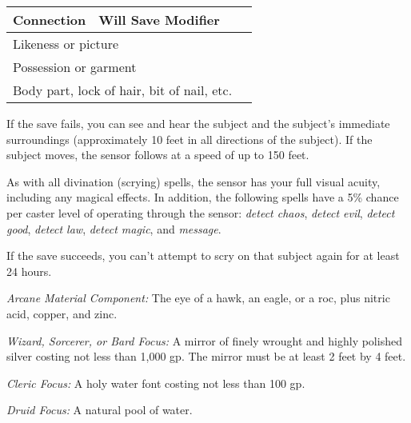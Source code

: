 \begin{longtable}{llll}
{\begin{minipage}[t]{0.064in}
\textbf{Connection}\end{minipage}} & \multicolumn{1}{|p{2.927in}|}{\begin{minipage}[t]{2.927in}\raggedleft
\textbf{Will Save Modifier}\end{minipage}}\\
\hline
\multicolumn{3}{p{1.573in}|}{\begin{minipage}[t]{1.573in}\raggedleft
Likeness or picture\end{minipage}} & \multicolumn{1}{|p{2.927in}|}{\begin{minipage}[t]{2.927in}\raggedleft
-2\end{minipage}}\\
\hline
\multicolumn{3}{p{1.573in}|}{\begin{minipage}[t]{1.573in}\raggedleft
Possession or garment\end{minipage}} & \multicolumn{1}{|p{2.927in}|}{\begin{minipage}[t]{2.927in}\raggedleft
-4\end{minipage}}\\
\hline
\multicolumn{3}{p{1.573in}|}{\begin{minipage}[t]{1.573in}\raggedleft
Body part, lock of hair, bit of nail, etc.\end{minipage}} & \multicolumn{1}{|p{2.927in}|}{\begin{minipage}[t]{2.927in}\raggedleft
-10\end{minipage}}\\
\hline
\end{longtable}

If the save fails, you can see and hear the subject and the subject's immediate 
surroundings (approximately 10 feet in all directions of the subject). If the subject 
moves, the sensor follows at a speed of up to 150 feet.

As with all divination (scrying) spells, the sensor has your full visual acuity, 
including any magical effects. In addition, the following spells have a 5\% chance 
per caster level of operating through the sensor: \textit{detect chaos}, \textit{detect 
evil}, \textit{detect good}, \textit{detect law}, \textit{detect magic}, and \textit{message}.

If the save succeeds, you can't attempt to scry on that subject again for at least 
24 hours.

\textit{Arcane Material Component:} The eye of a hawk, an eagle, or a roc, plus 
nitric acid, copper, and zinc.

\textit{Wizard, Sorcerer, or Bard Focus:} A mirror of finely wrought and highly 
polished silver costing not less than 1,000 gp. The mirror must be at least 2 feet 
by 4 feet.

\textit{Cleric Focus:} A holy water font costing not less than 100 gp.

\textit{Druid Focus:} A natural pool of water. 

